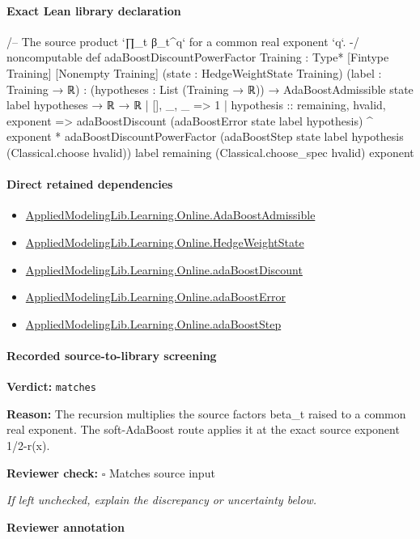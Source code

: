 \documentclass[10pt]{article}
\newcommand{\reviewerbox}{%
  \par\noindent\fbox{\parbox{0.96\linewidth}{\rule{0pt}{0.38in}}}\par
}
\newcommand{\reviewmatch}[1]{%
  \par\noindent\textbf{Reviewer check:} $\square$\; #1\par
  \noindent\emph{If left unchecked, explain the discrepancy or uncertainty below.}\par
}
\begin{document}
\paragraph{Exact Lean library declaration}
\begin{ReviewVerbatim}
/-- The source product `∏_t β_t^q` for a common real exponent `q`. -/
noncomputable def adaBoostDiscountPowerFactor
    {Training : Type*} [Fintype Training] [Nonempty Training]
    (state : HedgeWeightState Training) (label : Training → ℝ) :
    (hypotheses : List (Training → ℝ)) →
      AdaBoostAdmissible state label hypotheses → ℝ → ℝ
  | [], _, _ => 1
  | hypothesis :: remaining, hvalid, exponent =>
      adaBoostDiscount (adaBoostError state label hypothesis) ^ exponent *
        adaBoostDiscountPowerFactor
          (adaBoostStep state label hypothesis (Classical.choose hvalid)) label remaining
          (Classical.choose_spec hvalid) exponent
\end{ReviewVerbatim}

\paragraph{Direct retained dependencies}
\begin{itemize}\raggedright
\item \hyperlink{library-prerequisite-2771987b29f636cf}{Applied\allowbreak{}Modeling\allowbreak{}Lib.\allowbreak{}Learning.\allowbreak{}Online.\allowbreak{}Ada\allowbreak{}Boost\allowbreak{}Admissible}
\item \hyperlink{library-prerequisite-8196082d02788389}{Applied\allowbreak{}Modeling\allowbreak{}Lib.\allowbreak{}Learning.\allowbreak{}Online.\allowbreak{}Hedge\allowbreak{}Weight\allowbreak{}State}
\item \hyperlink{governing-declaration-4d632afbcb009574}{Applied\allowbreak{}Modeling\allowbreak{}Lib.\allowbreak{}Learning.\allowbreak{}Online.\allowbreak{}ada\allowbreak{}Boost\allowbreak{}Discount}
\item \hyperlink{governing-declaration-bd631eacbec4687c}{Applied\allowbreak{}Modeling\allowbreak{}Lib.\allowbreak{}Learning.\allowbreak{}Online.\allowbreak{}ada\allowbreak{}Boost\allowbreak{}Error}
\item \hyperlink{governing-declaration-ab9e0307acbbe7ff}{Applied\allowbreak{}Modeling\allowbreak{}Lib.\allowbreak{}Learning.\allowbreak{}Online.\allowbreak{}ada\allowbreak{}Boost\allowbreak{}Step}
\end{itemize}
\paragraph{Recorded source-to-library screening}
\textbf{Verdict:} \texttt{matches}
\\
{\raggedright
\textbf{Reason:} The recursion multiplies the source factors beta\_\allowbreak{}t raised to a common real exponent.\allowbreak{} The soft-\allowbreak{}AdaBoost route applies it at the exact source exponent 1/\allowbreak{}2-\allowbreak{}r(x).\allowbreak{}
\par}
\reviewmatch{Matches source input}
\noindent\textbf{Reviewer annotation}\par
\reviewerbox
\clearpage
\hypertarget{library-prerequisite-ff1cefb5582d918e}{}
\end{document}
